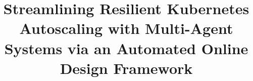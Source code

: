 \documentclass[conference]{IEEEtran}
\makeatletter
\newcommand{\linebreakand}{%
  \end{@IEEEauthorhalign}
  \hfill\mbox{}\par
  \mbox{}\hfill\begin{@IEEEauthorhalign}
}
\makeatother
\begin{document}
\title{Streamlining Resilient Kubernetes Autoscaling with Multi-Agent Systems via an Automated Online Design Framework\\
}


\author{










}
\end{document}
